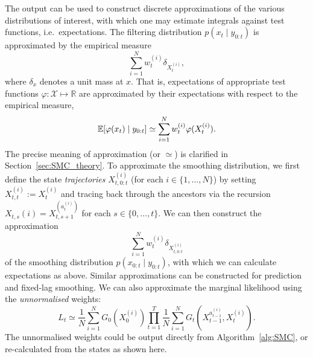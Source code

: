 The output can be used to construct discrete approximations of the various distributions of interest, with which one may estimate integrals against test functions, i.e.\ expectations.
The filtering distribution $p(x_t \mid y_{0:t})$ is approximated by the empirical measure
\begin{equation*}
\sum_{i=1}^N w_t^{(i)} \delta_{ X_t^{(i)} } ,
\end{equation*}
where $\delta_x$ denotes a unit mass at $x$.
That is, expectations of appropriate test functions $\varphi : \mathcal{X} \mapsto \mathbb{R}$ are approximated by their expectations with respect to the empirical measure,
\begin{equation*}
\mathbb{E}[ \varphi(x_t) \mid y_{0:t} ]
\simeq \sum_{i=1}^N w_t^{(i)} \varphi( X_t^{(i)} ) .
\end{equation*}
The precise meaning of approximation (or $\simeq$) is clarified in Section~\ref{sec:SMC_theory}.
To approximate the smoothing distribution, we first define the state \emph{trajectories} $X_{t,0:t}^{(i)}$ (for each $i \in \{1,\dots,N\}$) by setting $X_{t,t}^{(i)} := X_t^{(i)}$ and tracing back through the ancestors via the recursion $X_{t,s}{(i)} = X_{t,s+1}^{( a_t^{(i)} )}$ for each $s \in \{0,\dots, t\}$. 
We can then construct the approximation
\begin{equation*}
\sum_{i=1}^N w_t^{(i)} \delta_{ X_{t,0:t}^{(i)} } 
\end{equation*}
of the smoothing distribution $p(x_{0:t} \mid y_{0:t})$, with which we can calculate expectations as above.
Similar approximations can be constructed for prediction and fixed-lag smoothing.
We can also approximate the marginal likelihood using the \emph{unnormalised} weights:
\begin{equation}\label{eq:likelihood_estimate}
L_t 
\simeq \frac{1}{N} \sum_{i=1}^N G_0(X_0^{(i)}) \prod_{t=1}^T \frac{1}{N}
        \sum_{i=1}^N G_t( X_{t-1}^{ a_{t-1}^{(i)} }, X_t^{(i)} ) .
\end{equation}
The unnormalised weights could be output directly from Algorithm~\ref{alg:SMC}, or re-calculated from the states as shown here.







